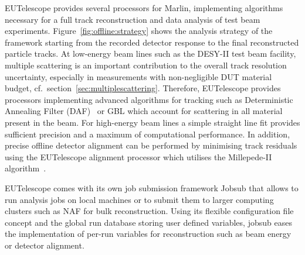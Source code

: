 EUTelescope provides several processors for Marlin, implementing algorithms necessary for a full track reconstruction and data analysis of test beam experiments. 
Figure~\ref{fig:offline:strategy} shows the analysis strategy of the framework starting from the recorded detector response to the final reconstructed particle tracks. 
At low-energy beam lines such as the DESY-II test beam facility, multiple scattering is an important contribution to the overall track resolution uncertainty,
 especially in measurements with non-negligible DUT material budget, cf.\ section~\ref{sec:multiplescattering}.
Therefore, EUTelescope provides processors implementing advanced algorithms for tracking such as Deterministic Annealing Filter (DAF)~\cite{ref:daffitter}
 or GBL which account for scattering in all material present in the beam.
For high-energy beam lines a simple straight line fit provides sufficient precision and a maximum of computational performance.
In addition, precise offline detector alignment can be performed by minimising track residuals using the EUTelescope alignment processor which utilises the Millepede-II algorithm~\cite{Blobel-2006}.

EUTelescope comes with its own job submission framework Jobsub that allows to run analysis jobs on local machines or to submit them to larger computing clusters such as NAF for bulk reconstruction.
Using its flexible configuration file concept and the global run database storing user defined variables,
 jobsub eases the implementation of per-run variables for reconstruction such as beam energy or detector alignment.
